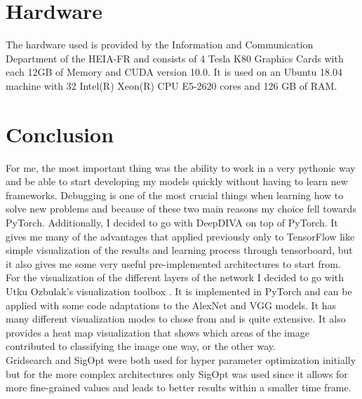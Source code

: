 \section{Hardware}

The hardware used is provided by the Information and Communication Department of the HEIA-FR and consists of 4 Tesla K80 Graphics Cards with each 12GB of Memory and CUDA version 10.0. It is used on an Ubuntu 18.04 machine with 32 Intel(R) Xeon(R) CPU E5-2620 cores and 126 GB of RAM.

\section{Conclusion}

For me, the most important thing was the ability to work in a very pythonic way and be able to start developing my models quickly without having to learn new frameworks. Debugging is one of the most crucial things when learning how to solve new problems and because of these two main reasons my choice fell towards PyTorch. Additionally, I decided to go with DeepDIVA on top of PyTorch. It gives me many of the advantages that applied previously only to TensorFlow like simple visualization of the results and learning process through tensorboard, but it also gives me some very useful pre-implemented architectures to start from. \\

For the visualization of the different layers of the network I decided to go with Utku Ozbulak's visualization toolbox \cite{viztoolbox}. It is implemented in PyTorch and can be applied with some code adaptations to the AlexNet and VGG models. It has many different visualization modes to chose from and is quite extensive. It also provides a heat map visualization that shows which areas of the image contributed to classifying the image one way, or the other way.\\

Gridsearch and SigOpt were both used for hyper parameter optimization initially but for the more complex architectures only SigOpt was used since it allows for more fine-grained values and leads to better results within a smaller time frame. \\